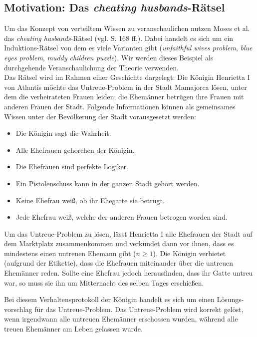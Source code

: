 \subsection{Motivation: Das \textit{cheating husbands}-Rätsel}
\label{motivation}
Um das Konzept von verteiltem Wissen zu veranschaulichen nutzen Moses et al. \cite{moses1986cheating} das \textit{cheating husbands}-Rätsel (vgl. \cite{moses1986cheating} S. 168 ff.).
Dabei handelt es sich um ein Induktions-Rätsel von dem es viele Varianten gibt (\textit{unfaithful wives problem}, \textit{blue eyes problem}, \textit{muddy children puzzle}). Wir werden dieses Beispiel als durchgehende Veranschaulichung der Theorie verwenden.\\
Das Rätsel wird im Rahmen einer Geschichte dargelegt: Die Königin Henrietta I von Atlantis möchte das Untreue-Problem in der Stadt Mamajorca lösen, unter dem die verheirateten Frauen leiden; die Ehemänner betrügen ihre Frauen mit anderen Frauen der Stadt.
Folgende Informationen können als gemeinsames Wissen unter der Bevölkerung der Stadt vorausgesetzt werden:
\begin{itemize}
	\item Die Königin sagt die Wahrheit.
	\item Alle Ehefrauen gehorchen der Königin.
	\item Die Ehefrauen sind perfekte Logiker.
	\item Ein Pistolenschuss kann in der ganzen Stadt gehört werden.
	\item Keine Ehefrau weiß, ob ihr Ehegatte sie betrügt.
	\item Jede Ehefrau weiß, welche der anderen Frauen betrogen worden sind.
\end{itemize}
Um das Untreue-Problem zu lösen, lässt Henrietta I alle Ehefrauen der Stadt auf dem Marktplatz zusammenkommen und verkündet dann vor ihnen, dass es mindestens einen untreuen Ehemann gibt ($n \ge 1$).
Die Königin verbietet (aufgrund der Etikette), dass die Ehefrauen miteinander über die untreuen Ehemänner reden.
Sollte eine Ehefrau jedoch herausfinden, dass ihr Gatte untreu war, so muss sie ihn um Mitternacht des selben Tages erschießen.\medskip

Bei diesem Verhaltensprotokoll der Königin handelt es sich um einen Lösungs-vorschlag für das Untreue-Problem.
Das Untreue-Problem wird korrekt gelöst, wenn irgendwann alle untreuen Ehemänner erschossen wurden, während alle treuen Ehemänner am Leben gelassen wurde.\\

